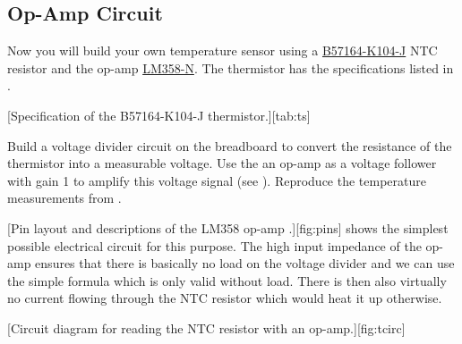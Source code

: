 \subsection{Op-Amp Circuit}\label{sec:temp}
Now you will build your own temperature sensor using a \href{https://eu.mouser.com/datasheet/2/400/NTC_Leaded_disks_K164-1317145.pdf}{B57164-K104-J} \ac{NTC} resistor and the \ac{op-amp} \href{http://www.ti.com/lit/ds/symlink/lm158-n.pdf}{LM358-N}. The thermistor has the specifications listed in .\par
%
[Specification of the B57164-K104-J thermistor.][tab:ts]
%
\begin{task}
  Build a voltage divider circuit on the breadboard to convert the resistance of the thermistor into a measurable voltage. Use the an \ac{op-amp} as a voltage follower with gain 1 to amplify this voltage signal (see ). Reproduce the temperature measurements from .
\end{task}
%
[Pin layout and descriptions of the LM358 \ac{op-amp} \cite{lm358}.][fig:pins]
%
 shows the simplest possible electrical circuit for this purpose. The high input impedance of the \ac{op-amp} ensures that there is basically no load on the voltage divider and we can use the simple formula which is only valid without load. There is then also virtually no current flowing through the \ac{NTC} resistor which would heat it up otherwise.\par
%
[Circuit diagram for reading the \ac{NTC} resistor with an \ac{op-amp}.][fig:tcirc]
%
